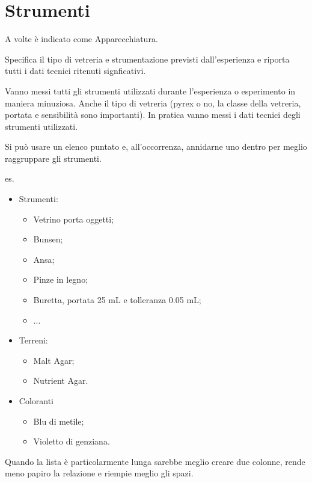 \section{Strumenti}
A volte è indicato come Apparecchiatura.

Specifica il tipo di vetreria e strumentazione previsti dall'esperienza e riporta tutti  i dati tecnici ritenuti signficativi. 

Vanno messi tutti gli strumenti utilizzati durante l'esperienza o esperimento in maniera minuziosa. Anche il tipo di vetreria (pyrex o no, la classe della vetreria, portata e sensibilità sono importanti). 
In pratica vanno messi i dati tecnici degli strumenti utilizzati. 

Si può usare un elenco puntato e, all'occorrenza, annidarne uno dentro per meglio raggruppare gli strumenti.

es.
\begin{itemize}
    \item Strumenti:
    \begin{itemize}
        \item Vetrino porta oggetti;
        \item Bunsen;
        \item Ansa;
        \item Pinze in legno;
        \item Buretta, portata 25 mL e tolleranza 0.05 mL;
        \item ...
    \end{itemize}
    \item Terreni:
    \begin{itemize}
    \item Malt Agar;
    \item Nutrient Agar.
    \end{itemize}
    \item Coloranti
    \begin{itemize}
        \item Blu di metile;
        \item Violetto di genziana.
    \end{itemize}
\end{itemize}

Quando la lista è particolarmente lunga sarebbe meglio creare due colonne, rende meno papiro la relazione e riempie meglio gli spazi.

